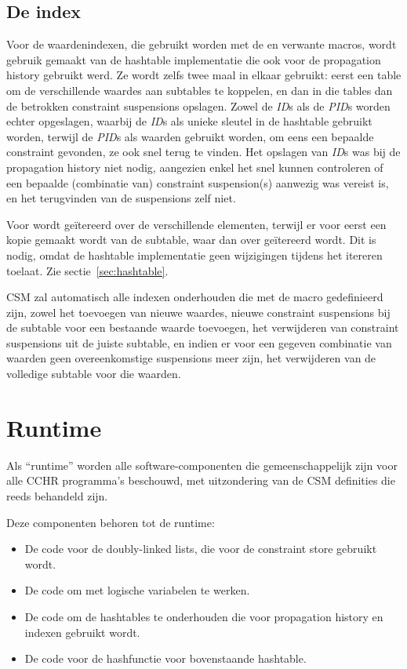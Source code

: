 \subsection{De index} \label{sec:index}

Voor de waardenindexen, die gebruikt worden met de  en verwante macros, wordt gebruik gemaakt van de hashtable implementatie die ook voor de propagation history gebruikt werd. Ze wordt zelfs twee maal in elkaar gebruikt: eerst een table om de verschillende waardes aan subtables te koppelen, en dan in die tables dan de betrokken constraint suspensions opslagen. Zowel de {\em ID}s als de {\em PID}s worden echter opgeslagen, waarbij de {\em ID}s als unieke sleutel in de hashtable gebruikt worden, terwijl de {\em PID}s als waarden gebruikt worden, om eens een bepaalde constraint gevonden, ze ook snel terug te vinden. Het opslagen van {\em ID}s was bij de propagation history niet nodig, aangezien enkel het snel kunnen controleren of een bepaalde (combinatie van) constraint suspension(s) aanwezig was vereist is, en het terugvinden van de suspensions zelf niet.

Voor  wordt ge\"itereerd over de verschillende elementen, terwijl er voor  eerst een kopie gemaakt wordt van de subtable, waar dan over ge\"itereerd wordt. Dit is nodig, omdat de hashtable implementatie geen wijzigingen tijdens het itereren toelaat. Zie sectie~\ref{sec:hashtable}.

CSM zal automatisch alle indexen onderhouden die met de macro  gedefinieerd zijn, zowel het toevoegen van nieuwe waardes, nieuwe constraint suspensions bij de subtable voor een bestaande waarde toevoegen, het verwijderen van constraint suspensions uit de juiste subtable, en indien er voor een gegeven combinatie van waarden geen overeenkomstige suspensions meer zijn, het verwijderen van de volledige subtable voor die waarden.

\section{Runtime} \label{sec:runtime}

Als ``runtime'' worden alle software-componenten die gemeenschappelijk zijn voor alle CCHR programma's beschouwd, met uitzondering van de CSM definities die reeds behandeld zijn.

Deze componenten behoren tot de runtime: \begin{itemize}
  \item De code voor de doubly-linked lists, die voor de constraint store gebruikt wordt.
  \item De code om met logische variabelen te werken.
  \item De code om de hashtables te onderhouden die voor propagation history en indexen gebruikt wordt.
  \item De code voor de hashfunctie voor bovenstaande hashtable.
\end{itemize}

